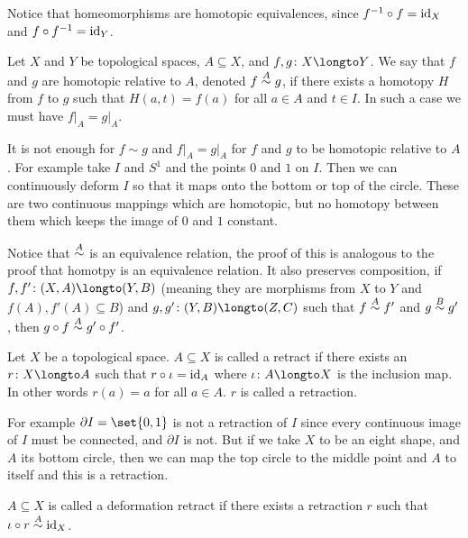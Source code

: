 \edefn

Notice that homeomorphisms are homotopic equivalences, since $f^{-1}\circ f={\rm id}_X$ and $f\circ f^{-1}={\rm id}_Y$.

\bdefn

    Let $X$ and $Y$ be topological spaces, $A\subseteq X$, and $f,g\colon X\longto Y$.
    We say that $f$ and $g$ are homotopic relative to $A$, denoted $f\buildrel A\over\sim g$, if there exists a homotopy $H$ from $f$ to $g$ such that $H(a,t)=f(a)$ for all $a\in A$ and $t\in I$.
    In such a case we must have $f\bigr|_A=g\bigr|_A$.

\edefn

It is not enough for $f\sim g$ and $f\bigr|_A=g\bigr|_A$ for $f$ and $g$ to be homotopic relative to $A$.
For example take $I$ and $S^1$ and the points $0$ and $1$ on $I$.
Then we can continuously deform $I$ so that it maps onto the bottom or top of the circle.
These are two continuous mappings which are homotopic, but no homotopy between them which keeps the image of $0$ and $1$ constant.

Notice that $\buildrel A\over\sim$ is an equivalence relation, the proof of this is analogous to the proof that homotpy is an equivalence relation.
It also preserves composition, if $f,f'\colon(X,A)\longto(Y,B)$ (meaning they are morphisms from $X$ to $Y$ and $f(A),f'(A)\subseteq B$) and $g,g'\colon(Y,B)\longto(Z,C)$ such that $f\buildrel A\over\sim f'$
and $g\buildrel B\over\sim g'$, then $g\circ f\buildrel A\over\sim g'\circ f'$.

\bdefn

    Let $X$ be a topological space.
    $A\subseteq X$ is called a {\emphcolor retract} if there exists an $r\colon X\longto A$ such that $r\circ\iota={\rm id}_A$ where $\iota\colon A\longto X$ is the inclusion map.
    In other words $r(a)=a$ for all $a\in A$.
    $r$ is called a {\emphcolor retraction}.

\edefn

For example $\partial I=\set{0,1}$ is not a retraction of $I$ since every continuous image of $I$ must be connected, and $\partial I$ is not.
But if we take $X$ to be an eight shape, and $A$ its bottom circle, then we can map the top circle to the middle point and $A$ to itself and this is a retraction.

\bdefn

    $A\subseteq X$ is called a {\emphcolor deformation retract} if there exists a retraction $r$ such that $\iota\circ r\buildrel A\over\sim{\rm id}_X$.

